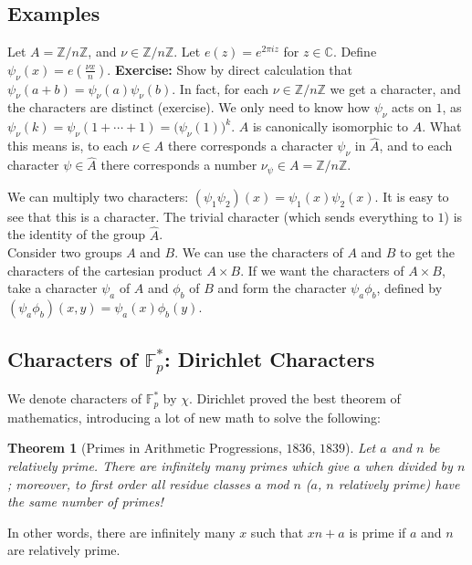 \documentclass[12pt,letterpaper]{report}
\newcommand{\C}{\ensuremath{\mathbb{C}}}
\newcommand{\Z}{\ensuremath{\mathbb{Z}}}
\newcommand{\F}{\mathbb{F}}
\newcommand{\Fp}{ \F_p }
\newcommand{\Fpf}{ \Fp^{*} }
\newcommand{\ZnZ}{ \Z / n\Z}
\newtheorem{thm}{Theorem}[section]
\begin{document}
\subsection{Examples}

Let $A = \Z/ n\Z$, and $\nu \in \ZnZ$. Let $e(z) = e^{2\pi i z}$
for $z \in \C$. Define $\psi_\nu(x) = e(\frac{\nu x}{n})$.
\textbf{Exercise:} Show by direct calculation that $\psi_\nu(a+b)
= \psi_\nu(a) \psi_\nu(b)$. In fact, for each $\nu \in \ZnZ$ we
get a character, and the characters are distinct (exercise). We
only need to know how $\psi_\nu$ acts on $1$, as $\psi_\nu(k) =
\psi_\nu(1 + \cdots + 1) = \Big(\psi_\nu(1) \Big)^k$. $\hat{A}$ is
canonically isomorphic to $A$. What this means is, to each $\nu
\in A$ there corresponds a character $\psi_\nu$ in $\hat{A}$, and
to each character $\psi \in \hat{A}$ there corresponds a number
$\nu_\psi \in A = \ZnZ$.

We can multiply two characters: $(\psi_1 \psi_2)(x) = \psi_1(x)
\psi_2(x)$. It is easy to see that this is a character. The
trivial character (which sends everything to $1$) is the identity
of the group $\hat{A}$. \\

Consider two groups $A$ and $B$. We can use the characters of $A$
and $B$ to get the characters of the cartesian product $A \times
B$. If we want the characters of $A \times B$, take a character
$\psi_a$ of $A$ and $\phi_b$ of $B$ and form the character $\psi_a
\phi_b$, defined by $(\psi_a \phi_b)(x,y) = \psi_a(x)\phi_b(y)$.

\subsection{Characters of $\Fpf$: Dirichlet Characters}

We denote characters of $\Fpf$ by $\chi$. Dirichlet proved the
best theorem of mathematics, introducing a lot of new math to
solve the following:

\begin{thm}[Primes in Arithmetic Progressions, $1836$, $1839$]
Let $a$ and $n$ be relatively prime. There are infinitely many
primes which give $a$ when divided by $n$; moreover, to first
order all residue classes $a$ mod $n$ ($a$, $n$ relatively prime)
have the same number of primes!
\end{thm}

In other words, there are infinitely many $x$ such that $xn + a$
is prime if $a$ and $n$ are relatively prime.
\end{document}
